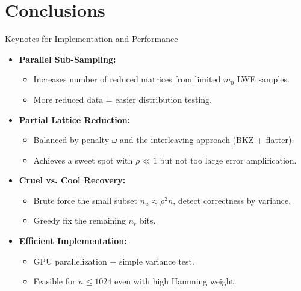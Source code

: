\documentclass{beamer}
\begin{document}
\section{Conclusions}
\begin{frame}{Keynotes for Implementation and Performance}
  \begin{itemize}
    \item \textbf{Parallel Sub-Sampling:}
      \begin{itemize}
        \item Increases number of reduced matrices from limited $m_0$ LWE samples.
        \item More reduced data = easier distribution testing.
      \end{itemize}
    \item \textbf{Partial Lattice Reduction:}
      \begin{itemize}
        \item Balanced by penalty $\omega$ and the interleaving approach (BKZ + flatter).
        \item Achieves a sweet spot with $\rho \ll 1$ but not too large error amplification.
      \end{itemize}
    \item \textbf{Cruel vs. Cool Recovery:}
      \begin{itemize}
        \item Brute force the small subset $n_u\approx \rho^2 n$, detect correctness by variance.
        \item Greedy fix the remaining $n_r$ bits.
      \end{itemize}
    \item \textbf{Efficient Implementation:}
      \begin{itemize}
        \item GPU parallelization + simple variance test.
        \item Feasible for $n \le 1024$ even with high Hamming weight.
      \end{itemize}
  \end{itemize}
\end{frame}
\end{document}
